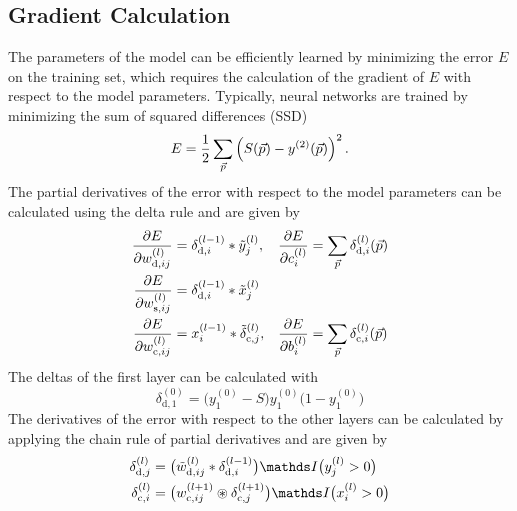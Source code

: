 \subsection{Gradient Calculation}
The parameters of the model can be efficiently learned by minimizing the error
$E$ on the training set, which requires the calculation of the gradient of $E$
with respect to the model parameters. Typically, neural networks are trained by
minimizing the sum of squared differences (SSD)
\begin{equation}
E = \frac{1}{2}\sum_{\vec{p}}\left(S(\vec{p}) -
y^{(2)}(\vec{p})\right)^2.
\end{equation}
The partial derivatives of the error with respect to the model parameters can be
calculated using the delta rule and are given by 
\begin{align}
\label{eq:dEd}
\frac{\partial E}{\partial w^{(l)}_{\text{d},ij}} &=
\delta^{(l-1)}_{\text{d},i} * \tilde{y}^{(l)}_j, &
\frac{\partial E}{\partial c^{(l)}_i} &= \sum_{\vect{p}}
\delta^{(l)}_{\text{d},i}(\vect{p}) \\
\label{eq:dEs}
\frac{\partial E}{\partial w^{(l)}_{\text{s},ij}}
 &= \delta^{(l-1)}_{\text{d},i} * \tilde{x}^{(l)}_j \\
 \label{eq:dEc}
\frac{\partial E}{\partial w^{(l)}_{\text{c},ij}} 
&= x^{(l-1)}_i * \tilde{\delta}^{(l)}_{\text{c},j},&
\frac{\partial E}{\partial b^{(l)}_i} &= \sum_{\vect{p}}
\delta^{(l)}_{\text{c},i}(\vect{p})
\end{align}
The deltas of the first layer can be calculated with
\begin{equation}
\delta^{(0)}_{\text{d},1} = \big(y^{(0)}_1 -S\big)y^{(0)}_1\big(1-y^{(0)}_1\big)
\label{eq:delta0}
\end{equation}
The derivatives of the error with respect to the other layers can be calculated
by applying the chain rule of partial derivatives and are given by
\begin{align}
\label{eq:deltad}
\delta^{(l)}_{\text{d},j} &=
\big(\tilde{w}^{(l)}_{\text{d},ij}*\delta^{(l-1)}_{\text{d},i}\big)\I\big(y^{(l)}_j
> 0\big)\\
\label{eq:deltac}
\delta^{(l)}_{\text{c},i} &=
\big(w^{(l+1)}_{\text{c},ij}\circledast\delta^{(l+1)}_{\text{c},j}\big)\I\big(x^{(l)}_i
> 0\big)
\end{align}
